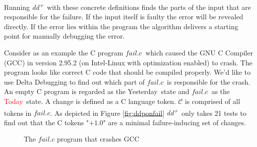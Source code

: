 \documentclass[a4paper,UKenglish]{lipics-v2018}
\newcommand{\ddp}{\textit{dd\textsuperscript{+}}}
\newcommand{\green}[1]{\textcolor{td-green}{#1}}
\newcommand{\red}[1]{\textcolor{red}{#1}}
\newcommand{\yd}[0]{\green{Yesterday}}
\newcommand{\td}[0]{\red{Today}}
\newcommand{\C}[0]{\ensuremath{\mathcal{C}}}
\newcommand{\reffail}[0]{\hyperref[fig:fail.c]{\ensuremath{fail.c}}}
\begin{document}
Running \ddp\ with these concrete definitions finds the parts of the input that are responsible for the failure. If the input itself is faulty the error will be revealed directly. If the error lies within the program the algorithm delivers a starting point for manually debugging the error.

Consider as an example the C program \reffail\ which caused the GNU C Compiler (GCC) in version 2.95.2 (on Intel-Linux with optimization enabled) to crash. The program looks like correct C code that should be compiled properly. We'd like to use Delta Debugging to find out which part of \reffail\ is responsible for the crash. An empty C program is regarded as the \yd\ state and \reffail\ as the \td\ state. A change is defined as a C language token. $\C$ is comprised of all tokens in \reffail. As depicted in Figure \ref{fig:ddponfail} \ddp\ only takes 21 tests to find out that the C tokens "$+ 1.0$" are a minimal failure-inducing set of changes.
\\
\begin{figure}[h!]
	\caption{The $fail.c$ program that crashes GCC}
	\label{fig:fail.c}
\end{figure}
\\
\end{document}
